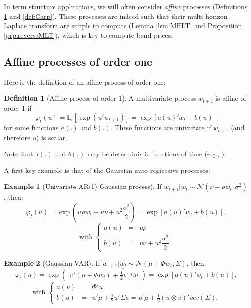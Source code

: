 \documentclass[
  12pt,
]{book}
\theoremstyle{definition}
\newtheorem{definition}{Definition}[chapter]
\theoremstyle{definition}
\newtheorem{example}{Example}[chapter]
\theoremstyle{definition}
\theoremstyle{definition}
\theoremstyle{remark}
\begin{document}
In term structure applications, we will often consider \emph{affine} processes (Definitions \ref{def:Car1} and \ref{def:Carp}). These processes are indeed such that their multi-horizon Laplace transform are simple to compute (Lemma \ref{lem:MHLT} and Proposition \ref{prp:reverseMLT}), which is key to compute bond prices.

\hypertarget{affine-processes-of-order-one}{%
\subsection{Affine processes of order one}\label{affine-processes-of-order-one}}

Here is the definition of an affine process of order one:

\begin{definition}[Affine process of order 1]
\protect\hypertarget{def:Car1}{}\label{def:Car1}A multivariate process \(w_{t+1}\) is affine of order 1 if
\[
\varphi_t(u)=\mathbb{E}_t[\exp(u'w_{t+1})]=\exp[a(u)'w_t+b(u)]
\]
for some functions \(a(.)\) and \(b(.)\). These functions are univariate if \(w_{t+1}\) (and therefore \(u\)) is scalar.
\end{definition}

Note that \(a(.)\) and \(b(.)\) may be deterministic functions of time (e.g., \citet{Chikhani_Renne_2022}).

A first key example is that of the Gaussian auto-regressive processes:

\begin{example}[Univariate AR(1) Gaussian process]
\protect\hypertarget{exm:GAR1}{}\label{exm:GAR1}If \(w_{t+1}|\underline{w_t} \sim \mathcal{N}(\nu+\rho w_t, \sigma^2)\), then:
\[
\varphi_t(u) = \exp\left(
u \rho w_t + u \nu + u^2  \frac{\sigma^2}{2}
\right) = \exp[a(u)'w_t+b(u)],
\]
\[
\mbox{with }\left\{
\begin{array}{cll}
a(u) &=& u \rho\\
b(u) &=& u \nu + u^2  \dfrac{\sigma^2}{2}.
\end{array}
\right.
\]
\end{example}

\begin{example}[Gaussian VAR]
\protect\hypertarget{exm:GVAR1}{}\label{exm:GVAR1}If \(w_{t+1}|\underline{w_t} \sim \mathcal{N}(\mu+\Phi w_t, \Sigma)\), then:
\[
\varphi_t(u) = \exp\left(
\begin{array}{l}
u' (\mu + \Phi  w_t)  +  \frac{1}{2} u' \Sigma u
\end{array}
\right) = \exp[a(u)'w_t+b(u)],
\]
\[
\mbox{with }\left\{
\begin{array}{ccl}
a(u) &=& \Phi'u\\
b(u) &=& u' \mu +  \frac{1}{2} u' \Sigma u = u' \mu + \frac{1}{2}(u \otimes u)' vec(\Sigma).
\end{array}
\right.
\]
\end{example}
\end{document}
